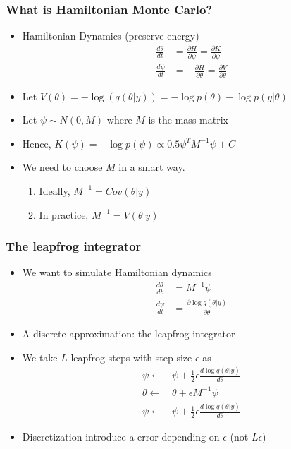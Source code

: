 \documentclass[10pt]{beamer}
\newcommand{\uured}[1]{\textcolor{uured}{#1}}
\begin{document}
\begin{frame}
\frametitle{What is Hamiltonian Monte Carlo?}

\begin{itemize}
\item Hamiltonian Dynamics (\uured{preserve energy})
\begin{align}
\frac{d\theta}{dt} &=  \frac{\partial H}{\partial \psi} = \frac{\partial K}{\partial \psi}\\
\frac{d\psi}{dt} &=  - \frac{\partial H}{\partial \theta} = \frac{\partial V}{\partial \theta}
\end{align}
\item Let $V(\theta) = - \log(q(\theta|y))= - \log p(\theta) - \log p(y | \theta)$
\item Let $\psi \sim N(0, M)$ where $M$ is the \uured{mass matrix}
\item Hence, $K(\psi) = - \log p(\psi) \propto 0.5 \psi^T M^{-1} \psi + C$
\pause
\item We need to choose $M$ in a smart way.
\begin{enumerate}
\item Ideally, $M^{-1}=Cov(\theta|y)$
\item In practice, $M^{-1}=V(\theta|y)$
\end{enumerate}
\end{itemize}
\end{frame}


\begin{frame}

\frametitle{The leapfrog integrator}

\begin{itemize}
\item We want to simulate Hamiltonian dynamics
\begin{align}
\frac{d\theta}{dt} &=  M^{-1} \psi\\
\frac{d\psi}{dt} &=  \frac{\partial \log q(\theta|y)}{\partial \theta}
\end{align}
\item A \uured{discrete} approximation: \uured{the leapfrog integrator}
\pause
\item We take $L$ leapfrog steps with step size $\epsilon$ as
\begin{align}
\psi \leftarrow &\psi + \frac{1}{2}\epsilon \frac{d\log q(\theta|y)}{d\theta}\\
\theta \leftarrow& \theta + \epsilon M^{-1}\psi\\
\psi \leftarrow &\psi + \frac{1}{2}\epsilon \frac{d\log q(\theta|y)}{d\theta}
\end{align}
\pause
\item Discretization introduce a error depending on $\epsilon$ (not $L \epsilon$)
\end{itemize}
\end{frame}
\end{document}

